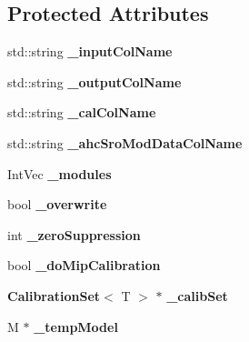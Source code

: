 \subsection*{Protected Attributes}
\begin{DoxyCompactItemize}
\item 
std\-::string {\bfseries \-\_\-input\-Col\-Name}\label{classCALICE_1_1FastCalibProcessor_a4e3450182079803160b3a3d49fe52bf5}

\item 
std\-::string {\bfseries \-\_\-output\-Col\-Name}\label{classCALICE_1_1FastCalibProcessor_a6ca793dcf8a511d5fcf2092c99592227}

\item 
std\-::string {\bfseries \-\_\-cal\-Col\-Name}\label{classCALICE_1_1FastCalibProcessor_a5bad8e294f9a71589ff02e911a789add}

\item 
std\-::string {\bfseries \-\_\-ahc\-Sro\-Mod\-Data\-Col\-Name}\label{classCALICE_1_1FastCalibProcessor_afe4587e7dccde530034ae8560295ab2a}

\item 
Int\-Vec {\bfseries \-\_\-modules}\label{classCALICE_1_1FastCalibProcessor_a279d5d4b719e274a887135f1bca70330}

\item 
bool {\bfseries \-\_\-overwrite}\label{classCALICE_1_1FastCalibProcessor_af756fa4e02404c38b78806a8333ecebd}

\item 
int {\bfseries \-\_\-zero\-Suppression}\label{classCALICE_1_1FastCalibProcessor_a579d58dc12aa93fb27a6dc7ae2b6654c}

\item 
bool {\bfseries \-\_\-do\-Mip\-Calibration}\label{classCALICE_1_1FastCalibProcessor_a396e71ec9015968a395f1d0d1727c897}

\item 
{\bf Calibration\-Set}$<$ T $>$ $\ast$ {\bfseries \-\_\-calib\-Set}\label{classCALICE_1_1FastCalibProcessor_add7475797b98bee61c39b503d5195dc5}

\item 
M $\ast$ {\bfseries \-\_\-temp\-Model}\label{classCALICE_1_1FastCalibProcessor_a6e48c942ee98efaf387e15e82c90fed7}

\end{DoxyCompactItemize}
